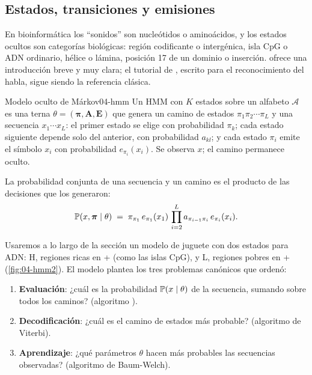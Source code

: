 \subsection{Estados, transiciones y emisiones}

En bioinformática los ``sonidos'' son nucleótidos o aminoácidos, y los estados ocultos son categorías biológicas: región codificante o intergénica, isla CpG o ADN ordinario, hélice o lámina, posición 17 de un dominio o inserción. \textcite{c04-eddy2004} ofrece una introducción breve y muy clara; el tutorial de \textcite{c04-rabiner1989}, escrito para el reconocimiento del habla, sigue siendo la referencia clásica.

\begin{definicion}{Modelo oculto de Márkov}{04-hmm}
Un HMM con $K$ estados sobre un alfabeto $\mathcal{A}$ es una terna $\theta=(\boldsymbol{\pi}, \mathbf{A}, \mathbf{E})$ que genera un camino de estados $\pi_1\pi_2\cdots\pi_L$ y una secuencia $x_1\cdots x_L$: el primer estado se elige con probabilidad $\pi_k$; cada estado siguiente depende solo del anterior, con probabilidad $a_{kl}$; y cada estado $\pi_i$ emite el símbolo $x_i$ con probabilidad $e_{\pi_i}(x_i)$. Se observa $x$; el camino permanece oculto.
\end{definicion}

La probabilidad conjunta de una secuencia y un camino es el producto de las decisiones que los generaron:
\begin{equation}\label{eq:04-conjunta}
\mathbb{P}(x,\boldsymbol{\pi}\mid\theta) \;=\; \pi_{\pi_1}\,e_{\pi_1}(x_1)\,\prod_{i=2}^{L} a_{\pi_{i-1}\pi_i}\,e_{\pi_i}(x_i).
\end{equation}

\begin{simbolos}
\end{simbolos}

Usaremos a lo largo de la sección un modelo de juguete con dos estados para ADN: \textsf{H}, regiones ricas en + (como las islas CpG), y \textsf{L}, regiones pobres en + (\cref{fig:04-hmm2}). El modelo plantea los tres problemas canónicos que \textcite{c04-rabiner1989} ordenó:
\begin{enumerate}
  \item \textbf{Evaluación}: ¿cuál es la probabilidad $\mathbb{P}(x\mid\theta)$ de la secuencia, sumando sobre todos los caminos? (algoritmo ).
  \item \textbf{Decodificación}: ¿cuál es el camino de estados más probable? (algoritmo de Viterbi).
  \item \textbf{Aprendizaje}: ¿qué parámetros $\theta$ hacen más probables las secuencias observadas? (algoritmo de Baum-Welch).
\end{enumerate}

